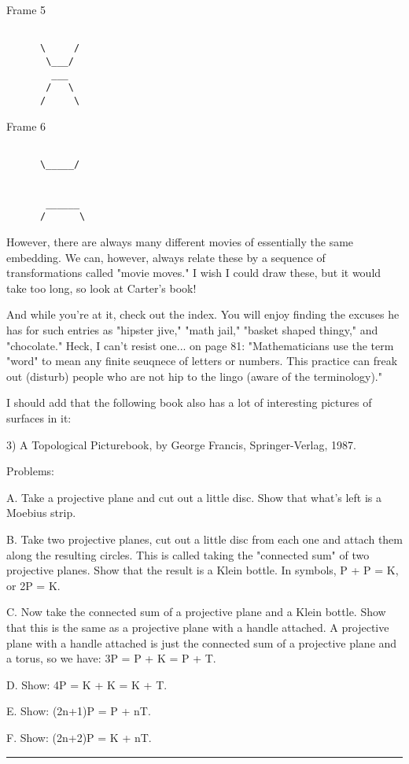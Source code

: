 Frame 5


\begin{verbatim}

      \     /
       \___/
        ___
       /   \
      /     \
\end{verbatim}
    

Frame 6


\begin{verbatim}

      \_____/
      
      
       ______     
      /      \
\end{verbatim}
    

However, there are always many different movies of essentially the same
embedding.  We can, however, always relate these by a sequence of
transformations called "movie moves."  I wish I could draw these, but it
would take too long, so look at Carter's book!  

And while you're at it, check out the index.  You will enjoy finding the
excuses he has for such entries as "hipster jive," "math jail," "basket
shaped thingy," and "chocolate."  Heck, I can't resist one... on page
81: "Mathematicians use the term "word" to mean any finite seuqnece of
letters or numbers.  This practice can freak out (disturb) people who
are not hip to the lingo (aware of the terminology)."

I should add that the following book also has a lot of interesting
pictures of surfaces in it:

3) A Topological Picturebook, by George Francis, Springer-Verlag, 1987.

Problems:
                   
A. Take a projective plane and cut out a little disc.  Show that what's
left is a Moebius strip.
                   
B. Take two projective planes, cut out a little disc from each one and
attach them along the resulting circles.  This is called taking the
"connected sum" of two projective planes.  Show that the result is a
Klein bottle.  In symbols, P + P = K, or 2P = K.
                  
C. Now take the connected sum of a projective plane and a Klein bottle.
Show that this is the same as a projective plane with a handle attached.
A projective plane with a handle attached is just the connected sum of a
projective plane and a torus, so we have: 3P = P + K = P + T.
                 
D. Show:  4P = K + K = K + T.
                 
E. Show: (2n+1)P = P + nT.
                 
F. Show: (2n+2)P = K + nT.
\par\noindent\rule{\textwidth}{0.4pt}

